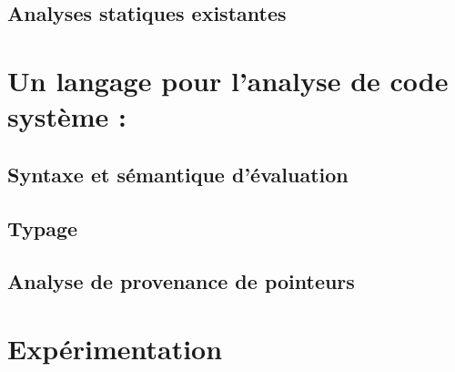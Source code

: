 \documentclass[a4paper,11pt]{memoir}
\begin{document}
%

\chapter{Analyses statiques existantes}

\label{cha:etatdelart}





\part{Un langage pour l'analyse de code système : \langname}
\label{part:lang}


\chapter{Syntaxe et sémantique d'évaluation}

\label{cha:lang}


\chapter{Typage}

\label{cha:typbase}



%

\chapter{Analyse de provenance de pointeurs}

\label{cha:qualifs}



%

\label{cha:ccl2}



\part{Expérimentation}
\label{part:xp}
\end{document}
